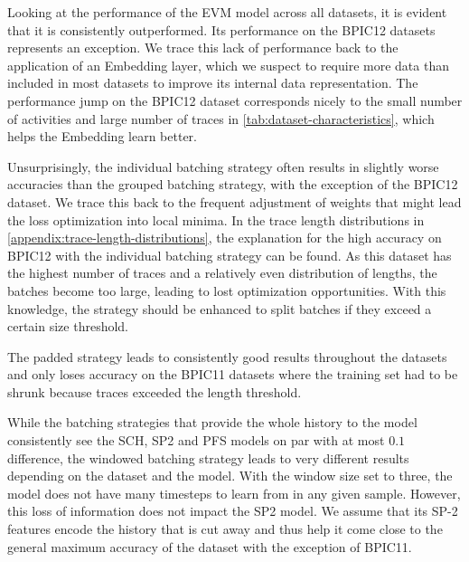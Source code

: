 Looking at the performance of the EVM model across all datasets, it is evident that it is consistently outperformed. Its performance on the BPIC12 datasets represents an exception. We trace this lack of performance back to the application of an Embedding layer, which we suspect to require more data than included in most datasets to improve its internal data representation. The performance jump on the BPIC12 dataset corresponds nicely to the small number of activities and large number of traces in \autoref{tab:dataset-characteristics}, which helps the Embedding learn better.

Unsurprisingly, the individual batching strategy often results in slightly worse accuracies than the grouped batching strategy, with the exception of the BPIC12 dataset. We trace this back to the frequent adjustment of weights that might lead the loss optimization into local minima. In the trace length distributions in \autoref{appendix:trace-length-distributions}, the explanation for the high accuracy on BPIC12 with the individual batching strategy can be found. As this dataset has the highest number of traces and a relatively even distribution of lengths, the batches become too large, leading to lost optimization opportunities. With this knowledge, the strategy should be enhanced to split batches if they exceed a certain size threshold.

The padded strategy leads to consistently good results throughout the datasets and only loses accuracy on the BPIC11 datasets where the training set had to be shrunk because traces exceeded the length threshold.

While the batching strategies that provide the whole history to the model consistently see the SCH, SP2 and PFS models on par with at most $0.1$ difference, the windowed batching strategy leads to very different results depending on the dataset and the model. With the window size set to three, the model does not have many timesteps to learn from in any given sample. However, this loss of information does not impact the SP2 model. We assume that its SP-2 features encode the history that is cut away and thus help it come close to the general maximum accuracy of the dataset with the exception of BPIC11.


